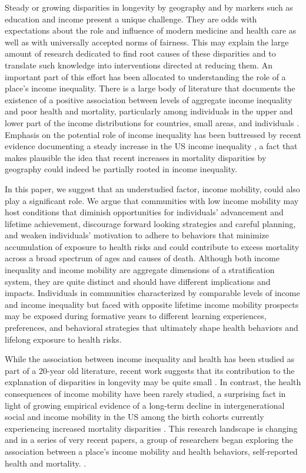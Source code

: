 \documentclass[11pt]{article}
\begin{document}
Steady or growing disparities in longevity by geography and by markers such as education and income present a unique challenge. They are odds with expectations about the role and influence of modern medicine and health care as well as with universally accepted norms of fairness. This may explain the large amount of research dedicated to find root causes of these disparities and to translate such knowledge into interventions directed at reducing them. An important part of this effort has been allocated to understanding the role of a place's income inequality. There is a large body of  literature that documents the existence of a positive association between levels of aggregate income inequality and poor health and mortality, particularly among individuals in the upper and lower part of the income distributions for countries, small areas, and individuals \citep{Pickett2015, SubraKawa2004,Wagstaff2000, WilkPick2006, WilkPick2009a, Kawachi1997,Wilkinson1992, DalyWilson2013, Wilkinson2009}. Emphasis on the potential role of income inequality has been buttressed by recent evidence documenting a steady increase in the US income inequality \citep{Piketty2003}, a fact that makes plausible the idea that recent increases in mortality disparities by geography could indeed be partially rooted in income inequality.

In this paper, we suggest that an understudied factor, income mobility, could also play a significant role. We argue that communities with low income mobility may host conditions that diminish opportunities for individuals' advancement and lifetime achievement, discourage forward looking strategies and careful planning, and weaken individuals' motivation to adhere to behaviors that minimize accumulation of exposure to health risks and could contribute to excess mortality across a broad spectrum of ages and  causes of death. Although both income inequality and income mobility are aggregate dimensions of a stratification system, they are quite distinct and should have different implications and impacts. Individuals in communities characterized by comparable levels of income and income inequality but faced with opposite lifetime income mobility prospects may be exposed during formative years to different learning experiences, preferences, and behavioral strategies that ultimately shape health behaviors and lifelong exposure to health risks. 

While the association between income inequality and health has been studied as part of a 20-year old literature, recent work suggests that its contribution to the explanation of disparities in longevity may be quite small \citep{Palloni2016, Murray2006, Ezzati2008}. In contrast, the health consequences of income mobility have been rarely studied, a surprising fact in light of growing empirical evidence of a long-term decline in intergenerational social and income mobility in the US among the birth cohorts currently experiencing increased mortality disparities \citep{Chetty2017, Hout1993, Hout1988, Hout1984}. This research landscape is changing and in a series of very recent papers, a group of researchers began exploring the association between a place's income mobility and health behaviors, self-reported health and mortality. \citep{Venkataramani2015,Venkataramani2016,Palloni2016}. 
\end{document}
